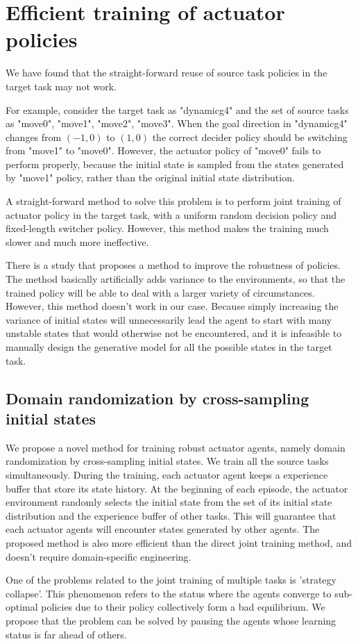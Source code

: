 
\section{Efficient training of actuator policies}
We have found that the straight-forward reuse of source task policies in the target task may not work.

For example, consider the target task as "dynamicg4" and the set of source tasks as "move0", "move1", "move2", "move3". When the goal direction in "dynamicg4" changes from $(-1,0)$ to $(1,0)$ the correct decider policy should be switching from "move1" to "move0". However, the actuator policy of "move0" fails to perform properly, because the initial state is sampled from the states generated by "move1" policy, rather than the original initial state distribution.

A straight-forward method to solve this problem is to perform joint training of actuator policy in the target task, with a uniform random decision policy and fixed-length switcher policy. However, this method makes the training much slower and much more ineffective.

There is a study \cite{tobin2017domain} that proposes a method to improve the robustness of policies. The method basically artificially adds variance to the environments, so that the trained policy will be able to deal with a larger variety of circumstances. However, this method doesn't work in our case. Because simply increasing the variance of initial states will unnecessarily lead the agent to start with many unstable states that would otherwise not be encountered, and it is infeasible to manually design the generative model for all the possible states in the target task.

\subsection{Domain randomization by cross-sampling initial states}
We propose a novel method for training robust actuator agents, namely domain randomization by cross-sampling initial states. We train all the source tasks simultaneously. During the training, each actuator agent keeps a experience buffer that store its state history. At the beginning of each episode, the actuator environment randomly selects the initial state from the set of its initial state distribution and the experience buffer of other tasks. This will guarantee that each actuator agents will encounter states generated by other agents. The proposed method is also more efficient than the direct joint training method, and doesn't require domain-specific engineering.

One of the problems related to the joint training of multiple tasks is 'strategy collapse'. This phenomenon refers to the status where the agents converge to sub-optimal policies due to their policy collectively form a bad equilibrium. We propose that the problem can be solved by pausing the agents whose learning status is far ahead of others.

